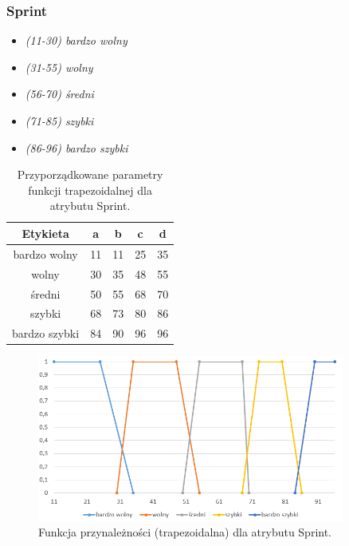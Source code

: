 \documentclass{classrep}
\begin{document}
	\subsubsection{Sprint}
	\begin{itemize}
		\item \textsl{(11-30) bardzo wolny}
		\item \textsl{(31-55) wolny}
		\item \textsl{(56-70) średni}
		\item \textsl{(71-85) szybki}
		\item \textsl{(86-96) bardzo szybki}
	\end{itemize}
	\begin{table}[h!]
		\centering
		\begin{tabular} {c c c c c}
			\hline
			\textbf{Etykieta} & \textbf{a} & \textbf{b} & \textbf{c} & \textbf{d} \\ [0.5ex] 
			\hline	
			\hline 
			bardzo wolny & 11 & 11 & 25 &	35 \\
			wolny & 30 & 35 & 48 & 55  \\
			średni & 50 & 55 & 68 & 70  \\
			szybki & 68 & 73 & 80 & 86  \\
			bardzo szybki & 84 & 90 & 96 & 96  \\	
			\hline
		\end{tabular}
		\caption{Przyporządkowane parametry funkcji trapezoidalnej dla atrybutu Sprint. }
		\label{tabelaSprint}
	\end{table}
	\begin{figure}[h!]
		\centering
		\includegraphics[width=0.9\textwidth]{zmienne/9.png}
		\caption{Funkcja przynależności (trapezoidalna) dla atrybutu Sprint.}
		\label{wykresSprint}
	\end{figure}


	\newpage
\end{document}
